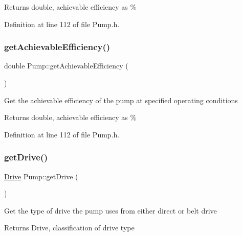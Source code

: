 \begin{DoxyReturn}{Returns}
double, achievable efficiency as \% 
\end{DoxyReturn}


Definition at line 112 of file Pump.\+h.

\mbox{\label{class_pump_acf100af543142ab8404fc0ce2df1d157}} 
\subsubsection{\texorpdfstring{get\+Achievable\+Efficiency()}{getAchievableEfficiency()}\hspace{0.1cm}{\footnotesize\ttfamily [3/3]}}
{\footnotesize\ttfamily double Pump\+::get\+Achievable\+Efficiency (\begin{DoxyParamCaption}{ }\end{DoxyParamCaption})\hspace{0.3cm}{\ttfamily [inline]}}

Get the achievable efficiency of the pump at specified operating conditions

\begin{DoxyReturn}{Returns}
double, achievable efficiency as \% 
\end{DoxyReturn}


Definition at line 112 of file Pump.\+h.

\mbox{\label{class_pump_a7eae412e42d0a3351408391cd5fbef4e}} 
\subsubsection{\texorpdfstring{get\+Drive()}{getDrive()}\hspace{0.1cm}{\footnotesize\ttfamily [1/3]}}
{\footnotesize\ttfamily \hyperlink{class_pump_a32bf0ade131a11bb3b3fb374f638e983}{Drive} Pump\+::get\+Drive (\begin{DoxyParamCaption}{ }\end{DoxyParamCaption})\hspace{0.3cm}{\ttfamily [inline]}}

Get the type of drive the pump uses from either direct or belt drive

\begin{DoxyReturn}{Returns}
Drive, classification of drive type 
\end{DoxyReturn}


